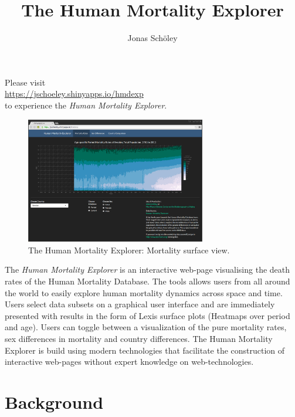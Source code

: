 \documentclass[
  12pt
]{scrartcl}
\title{The Human Mortality Explorer}
\subtitle{An Interactive Online Visualization \vskip 0.2em of the Human Mortality Database}
\author{Jonas Schöley}
\begin{document}
\maketitle

\begin{center}
  {\Large Please visit\\\url{https://jschoeley.shinyapps.io/hmdexp}\\to experience the \emph{Human Mortality Explorer}.}
\end{center}

\begin{figure}[ht!]
  \centering
  \includegraphics[width = 0.7\textwidth]{./fig/hmd_screen_mx.png}
  \caption{The Human Mortality Explorer: Mortality surface view.}
\end{figure}

\begin{abstract2}
  The \emph{Human Mortality Explorer} is an interactive web-page visualising the death rates of the Human Mortality Database. The tools allows users from all around the world to easily explore human mortality dynamics across space and time. Users select data subsets on a graphical user interface and are immediately presented with results in the form of Lexis surface plots (Heatmaps over period and age). Users can toggle between a visualization of the pure mortality rates, sex differences in mortality and country differences. The Human Mortality Explorer is build using modern technologies that facilitate the construction of interactive web-pages without expert knowledge on web-technologies.
\end{abstract2}

\clearpage


\section*{Background}
\end{document}

